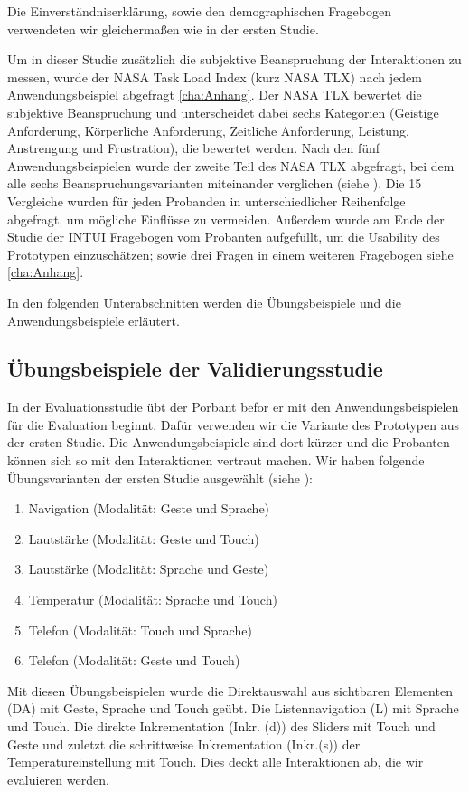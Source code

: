 Die Einverständniserklärung, sowie den demographischen Fragebogen verwendeten wir gleichermaßen wie in der ersten Studie. 

Um in dieser Studie zusätzlich die subjektive Beanspruchung der Interaktionen zu messen, wurde der NASA Task Load Index (kurz NASA TLX) nach jedem Anwendungsbeispiel abgefragt \ref{cha:Anhang}. 
Der NASA TLX bewertet die subjektive Beanspruchung und unterscheidet dabei sechs Kategorien (Geistige Anforderung, Körperliche Anforderung, Zeitliche Anforderung, Leistung, Anstrengung und Frustration), die bewertet werden. 
Nach den fünf Anwendungsbeispielen wurde der zweite Teil des NASA TLX abgefragt, bei dem alle sechs Beanspruchungsvarianten miteinander verglichen (siehe ). 
Die 15 Vergleiche wurden für jeden Probanden in unterschiedlicher Reihenfolge abgefragt, um mögliche Einflüsse zu vermeiden. 
Außerdem wurde am Ende der Studie der INTUI Fragebogen vom Probanten aufgefüllt, um die Usability des Prototypen einzuschätzen; sowie drei Fragen in einem weiteren Fragebogen siehe \ref{cha:Anhang}. 
  
In den folgenden Unterabschnitten werden die Übungsbeispiele und die Anwendungsbeispiele erläutert.

\subsection[Übungsbeispiele]{Übungsbeispiele der Validierungsstudie}
In der Evaluationsstudie übt der Porbant befor er mit den Anwendungsbeispielen für die Evaluation beginnt. 
Dafür verwenden wir die Variante des Prototypen aus der ersten Studie. 
Die Anwendungsbeispiele sind dort kürzer und die Probanten können sich so mit den Interaktionen vertraut machen.
Wir haben folgende Übungsvarianten der ersten Studie ausgewählt (siehe ):
\begin{enumerate}
	\item Navigation (Modalität: Geste und Sprache)
	\item Lautstärke (Modalität: Geste und Touch)
	\item Lautstärke (Modalität: Sprache und Geste)
	\item Temperatur (Modalität: Sprache und Touch)
	\item Telefon (Modalität: Touch und Sprache)
	\item Telefon (Modalität: Geste und Touch)
\end{enumerate}
Mit diesen Übungsbeispielen wurde die Direktauswahl aus sichtbaren Elementen (DA) mit Geste, Sprache und Touch geübt. 
Die Listennavigation (L) mit Sprache und Touch. 
Die direkte Inkrementation (Inkr. (d)) des Sliders mit Touch und Geste und zuletzt die schrittweise Inkrementation (Inkr.(s)) der Temperatureinstellung mit Touch. 
Dies deckt alle Interaktionen ab, die wir evaluieren werden. 

